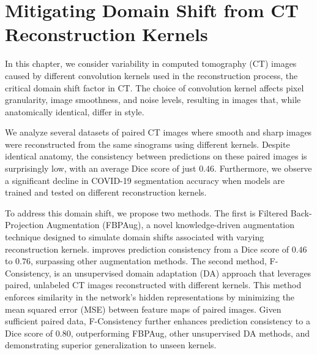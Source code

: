 

\chapter{Mitigating Domain Shift from CT Reconstruction Kernels}
\label{chap:ct}

In this chapter, we consider variability in computed tomography (CT) images caused by different convolution kernels used in the reconstruction process, the critical domain shift factor in CT. The choice of convolution kernel affects pixel granularity, image smoothness, and noise levels, resulting in images that, while anatomically identical, differ in style.

We analyze several datasets of paired CT images where smooth and sharp images were reconstructed from the same sinograms using different kernels. Despite identical anatomy, the consistency between predictions on these paired images is surprisingly low, with an average Dice score of just $0.46$. Furthermore, we observe a significant decline in COVID-19 segmentation accuracy when models are trained and tested on different reconstruction kernels.

To address this domain shift, we propose two methods. The first is Filtered Back-Projection Augmentation (FBPAug), a novel knowledge-driven augmentation technique designed to simulate domain shifts associated with varying reconstruction kernels.  improves prediction consistency from a Dice score of $0.46$ to $0.76$, surpassing other augmentation methods. The second method, F-Consistency, is an unsupervised domain adaptation (DA) approach that leverages paired, unlabeled CT images reconstructed with different kernels. This method enforces similarity in the network’s hidden representations by minimizing the mean squared error (MSE) between feature maps of paired images. Given sufficient paired data, F-Consistency further enhances prediction consistency to a Dice score of $0.80$, outperforming FBPAug, other unsupervised DA methods, and demonstrating superior generalization to unseen kernels.

